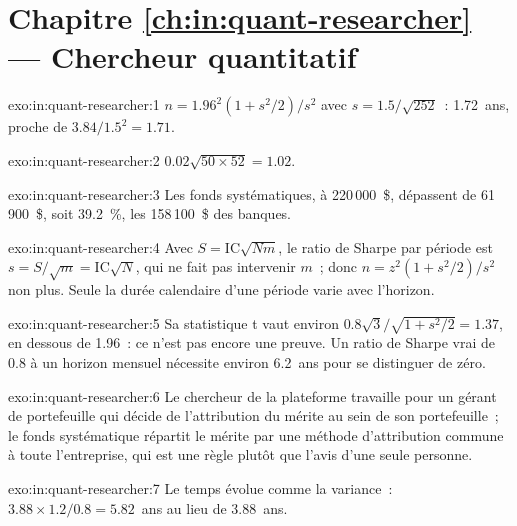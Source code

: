\section*{Chapitre \ref{ch:in:quant-researcher} --- Chercheur quantitatif}

\begin{solution}{exo:in:quant-researcher:1}
$n=1.96^2(1+s^2/2)/s^2$ avec $s=1.5/\sqrt{252}$~: 1.72~ans, proche de $3.84/1.5^2=1.71$.
\end{solution}

\begin{solution}{exo:in:quant-researcher:2}
$0.02\sqrt{50\times52}=1.02$.
\end{solution}

\begin{solution}{exo:in:quant-researcher:3}
Les fonds systématiques, à 220\,000~\$, dépassent de 61\,900~\$, soit 39.2~\%, les 158\,100~\$ des banques.
\end{solution}

\begin{solution}{exo:in:quant-researcher:4}
Avec $S=\mathrm{IC}\sqrt{Nm}$, le ratio de Sharpe par période est $s=S/\sqrt m=\mathrm{IC}\sqrt N$, qui ne fait pas intervenir $m$~;
donc $n=z^2(1+s^2/2)/s^2$ non plus. Seule la durée calendaire d'une période varie avec l'horizon.
\end{solution}

\begin{solution}{exo:in:quant-researcher:5}
Sa statistique t vaut environ $0.8\sqrt3/\sqrt{1+s^2/2}=1.37$, en dessous de 1.96~: ce n'est pas encore une preuve. Un ratio de Sharpe vrai de 0.8 à un
horizon mensuel nécessite environ 6.2~ans pour se distinguer de zéro.
\end{solution}

\begin{solution}{exo:in:quant-researcher:6}
Le chercheur de la plateforme travaille pour un gérant de portefeuille qui décide de l'attribution du mérite au sein de son portefeuille~; le fonds systématique répartit
le mérite par une méthode d'attribution commune à toute l'entreprise, qui est une règle plutôt que l'avis d'une seule personne.
\end{solution}

\begin{solution}{exo:in:quant-researcher:7}
Le temps évolue comme la variance~: $3.88\times1.2/0.8=5.82$~ans au lieu de 3.88~ans.
\end{solution}

